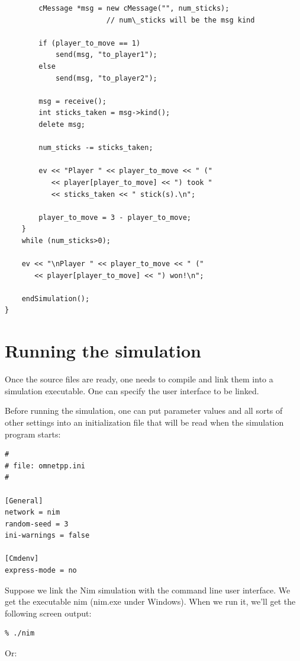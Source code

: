\begin{verbatim}
        cMessage *msg = new cMessage("", num_sticks);
                        // num\_sticks will be the msg kind

        if (player_to_move == 1)
            send(msg, "to_player1");
        else
            send(msg, "to_player2");

        msg = receive();
        int sticks_taken = msg->kind();
        delete msg;

        num_sticks -= sticks_taken;

        ev << "Player " << player_to_move << " ("
           << player[player_to_move] << ") took "
           << sticks_taken << " stick(s).\n";

        player_to_move = 3 - player_to_move;
    }
    while (num_sticks>0);

    ev << "\nPlayer " << player_to_move << " ("
       << player[player_to_move] << ") won!\n";

    endSimulation();
}
\end{verbatim}




\section{Running the simulation}

Once the source files are ready, one needs to compile and link
them into a simulation executable. One can specify the user interface
to be linked.

Before running the simulation, one can put parameter values and
all sorts of other settings into an initialization file that
will be read when the simulation program starts:


\begin{verbatim}
#
# file: omnetpp.ini
#

[General]
network = nim
random-seed = 3
ini-warnings = false

[Cmdenv]
express-mode = no
\end{verbatim}

Suppose we link the Nim simulation with the command line user
interface. We get the executable nim (nim.exe under Windows).
When we run it, we'll get the following screen output:

\begin{verbatim}
% ./nim
\end{verbatim}

Or:

